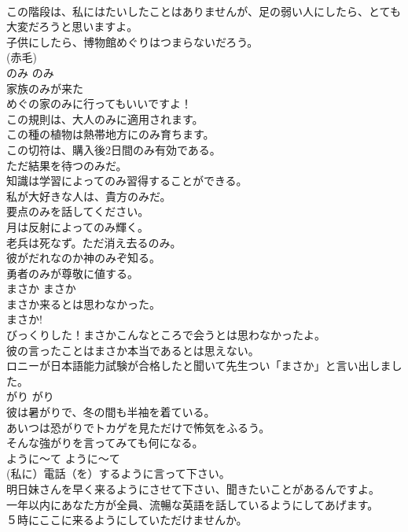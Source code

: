 \documentclass[8pt]{extreport}
\begin{document}
\begin{CJK}{UTF8}{min}
\\	この階段は、私にはたいしたことはありませんが、足の弱い人にしたら、とても大変だろうと思いますよ。  
\\	子供にしたら、博物館めぐりはつまらないだろう。  
\\	(赤毛)
\\	のみ	のみ	
\\	家族のみが来た   
\\	めぐの家のみに行ってもいいですよ！  
\\	この規則は、大人のみに適用されます。  
\\	この種の植物は熱帯地方にのみ育ちます。  
\\	この切符は、購入後2日間のみ有効である。  
\\	ただ結果を待つのみだ。  
\\	知識は学習によってのみ習得することができる。  
\\	私が大好きな人は、貴方のみだ。  
\\	要点のみを話してください。   
\\	月は反射によってのみ輝く。   
\\	老兵は死なず。ただ消え去るのみ。   
\\	彼がだれなのか神のみぞ知る。   
\\	勇者のみが尊敬に値する。   
\\	まさか	まさか	
\\	まさか来るとは思わなかった。  
\\	まさか!  
\\	びっくりした！まさかこんなところで会うとは思わなかったよ。  
\\	彼の言ったことはまさか本当であるとは思えない。  
\\	ロニーが日本語能力試験が合格したと聞いて先生つい「まさか」と言い出しました。  
\\	がり	がり	
\\	彼は暑がりで、冬の間も半袖を着ている。  
\\	あいつは恐がりでトカゲを見ただけで怖気をふるう。  
\\	そんな強がりを言ってみても何になる。  
\\	ように〜て	ように〜て	
\\	(私に）電話（を）するように言って下さい。  
\\	明日妹さんを早く来るようにさせて下さい、聞きたいことがあるんですよ。  
\\	一年以内にあなた方が全員、流暢な英語を話しているようにしてあげます。  
\\	５時にここに来るようにしていただけませんか。  

\end{CJK}
\end{document}
